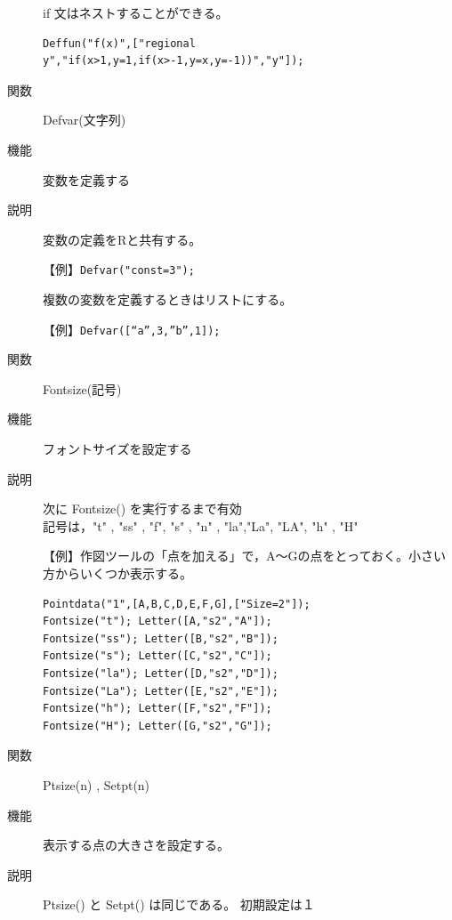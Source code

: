 \documentclass[papersize,a4paper,10pt,uplatex]{jsarticle}
\begin{document}
\begin{description}
\vspace{\baselineskip}
\hspace{20mm}\scalebox{0.9}{}

if 文はネストすることができる。
\begin{verbatim}
Deffun("f(x)",["regional y","if(x>1,y=1,if(x>-1,y=x,y=-1))","y"]);
\end{verbatim}

\vspace{\baselineskip}
\hspace{20mm}\scalebox{0.9}{}


\vspace{\baselineskip}
\hypertarget{defvar}{}
\item[関数]Defvar(文字列)
\item[機能]変数を定義する
\item[説明]変数の定義をRと共有する。

【例】\verb|Defvar("const=3");|

\vspace{\baselineskip}
複数の変数を定義するときはリストにする。

【例】\verb|Defvar([“a”,3,”b”,1]);|

\vspace{\baselineskip}
\hypertarget{fontsize}{}
\item[関数]Fontsize(記号)
\item[機能]フォントサイズを設定する
\item[説明]次に Fontsize() を実行するまで有効\\
記号は，"t" , "ss" , "f", "s" , "n" , "la","La", "LA", "h" , "H"

【例】作図ツールの「点を加える」で，A〜Gの点をとっておく。小さい方からいくつか表示する。
\begin{verbatim}
Pointdata("1",[A,B,C,D,E,F,G],["Size=2"]);
Fontsize("t"); Letter([A,"s2","A"]);
Fontsize("ss"); Letter([B,"s2","B"]);
Fontsize("s"); Letter([C,"s2","C"]);
Fontsize("la"); Letter([D,"s2","D"]);
Fontsize("La"); Letter([E,"s2","E"]);
Fontsize("h"); Letter([F,"s2","F"]);
Fontsize("H"); Letter([G,"s2","G"]);
\end{verbatim}


\vspace{\baselineskip}
\hypertarget{setpt}{}
\hypertarget{ptsize}{}
\item[関数]Ptsize(n) , Setpt(n)
\item[機能]表示する点の大きさを設定する。
\item[説明]Ptsize() と Setpt() は同じである。 初期設定は１


\end{description}
\end{document}
